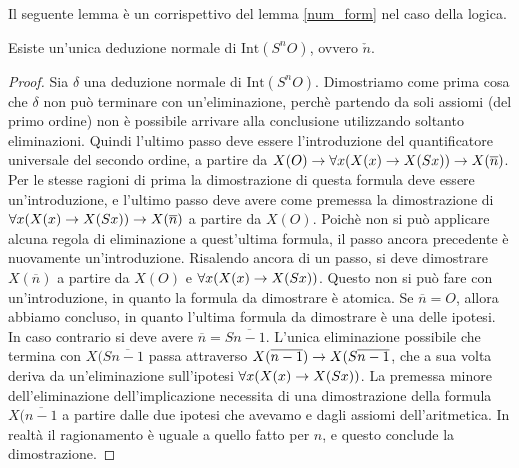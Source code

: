 \documentclass[]{marticle}
\begin{document}
Il seguente lemma \`e un corrispettivo del lemma \ref{num_form} nel caso della
logica.
\begin{block}[Lemma]
    \label{ded_form}
    Esiste un'unica deduzione normale di $\text{Int} (S^nO)$, ovvero
    $\check{n}$.
\end{block}
\begin{proof}
    Sia $\delta$ una deduzione normale di $\text{Int} (S^nO)$. Dimostriamo
    come prima cosa che $\delta$ non pu\`o terminare con un'eliminazione,
    perch\`e partendo da soli assiomi (del primo ordine) non \`e possibile
    arrivare alla conclusione utilizzando soltanto eliminazioni. Quindi l'ultimo
    passo deve essere l'introduzione del quantificatore universale del secondo
    ordine, a partire da $X(O) \rightarrow \forall x (X(x)\rightarrow X(Sx)) \rightarrow
    X(\overline{n})$. Per le stesse ragioni di prima la dimostrazione di questa
    formula deve essere un'introduzione, e l'ultimo passo deve avere come
    premessa la dimostrazione di $\forall x (X(x)\rightarrow X(Sx)) \rightarrow
    X(\overline{n})$ a partire da $X(O)$. Poich\`e non si pu\`o applicare alcuna
    regola di eliminazione a quest'ultima formula, il passo ancora precedente
    \`e nuovamente un'introduzione. Risalendo ancora di un passo, si deve
    dimostrare $X(\overline{n})$ a partire da $X(O)$ e $\forall x (X(x)\rightarrow
    X(Sx))$. Questo non si pu\`o fare con un'introduzione, in quanto la formula
    da dimostrare \`e atomica. Se $\overline{n} = O$, allora abbiamo concluso,
    in quanto l'ultima formula da dimostrare \`e una delle ipotesi. In caso
    contrario si deve avere $\overline{n} = S \overline{n-1}$. L'unica
    eliminazione possibile che termina con $X(S\overline{n-1}$ passa attraverso
    $X(\overline{n-1}) \rightarrow X(S \overline{n-1}$, che a sua volta deriva da
    un'eliminazione sull'ipotesi $\forall x(X(x)\rightarrow X(Sx))$. La premessa minore
    dell'eliminazione dell'implicazione necessita di una dimostrazione della
    formula $X(\overline{n-1}$ a partire dalle due ipotesi che avevamo e dagli
    assiomi dell'aritmetica. In realt\`a il ragionamento \`e uguale a quello
    fatto per $n$, e questo conclude la dimostrazione.
\end{proof}
\end{document}
